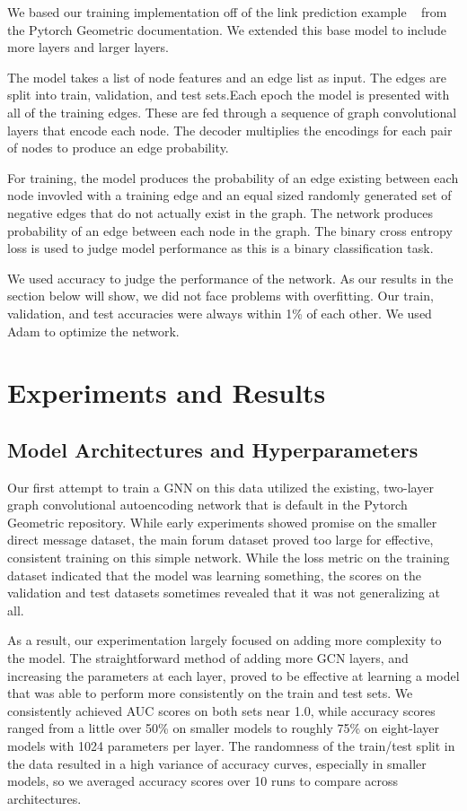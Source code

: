 \documentclass[10pt,twocolumn,letterpaper]{article}
\begin{document}
We based our training implementation off of the link prediction example ~\cite{pytorch-geometric} from the Pytorch Geometric documentation. We extended this base model to include more layers and larger layers.

The model takes a list of node features and an edge list as input. The edges are split into train, validation, and test sets.Each epoch the model is presented with all of the training edges. These are fed through a sequence of graph convolutional layers that encode each node. The decoder multiplies the encodings for each pair of nodes to produce an edge probability.

For training, the model produces the probability of an edge existing between each node invovled with a training edge and an equal sized randomly generated set of negative edges that do not actually exist in the graph.
The network produces probability of an edge between each node in the graph. The binary cross entropy loss is used to judge model performance as this is a binary classification task.

We used accuracy to judge the performance of the network. As our results in the section below will show, we did not face problems with overfitting. Our train, validation, and test accuracies were always within 1\% of each other. We used Adam to optimize the network.

\section{Experiments and Results}
\subsection{Model Architectures and Hyperparameters}

Our first attempt to train a GNN on this data utilized the existing, two-layer graph convolutional autoencoding network that is default in the Pytorch Geometric repository. While early experiments showed promise on the smaller direct message dataset, the main forum dataset proved too large for effective, consistent training on this simple network. While the loss metric on the training dataset indicated that the model was learning something, the scores on the validation and test datasets sometimes revealed that it was not generalizing at all. 

As a result, our experimentation largely focused on adding more complexity to the model. The straightforward method of adding more GCN layers, and increasing the parameters at each layer, proved to be effective at learning a model that was able to perform more consistently on the train and test sets. We consistently achieved AUC scores on both sets near 1.0, while accuracy scores ranged from a little over 50\% on smaller models to roughly 75\% on eight-layer models with 1024 parameters per layer. The randomness of the train/test split in the data resulted in a high variance of accuracy curves, especially in smaller models, so we averaged accuracy scores over 10 runs to compare across architectures. 
\end{document}
